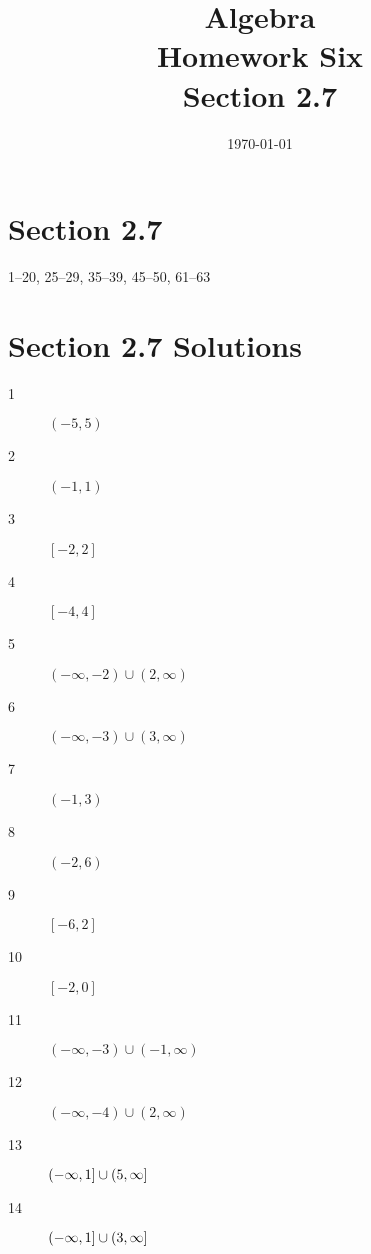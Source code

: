 \documentclass[letterpaper]{exam}
\title{Algebra \\ Homework Six \\ Section 2.7 }
\author{}
\date{\today}
\begin{document}
  \maketitle

  \section{Section 2.7}
  1--20, 25--29, 35--39, 45--50, 61--63

  \ifprintanswers{}

    \section{Section 2.7 Solutions} 

   \begin{description}

      \item[1] $ ( -5, 5 ) $

      \item[2] $ ( -1, 1 ) $

      \item[3] $ [ -2, 2 ] $

      \item[4] $ [ -4, 4 ] $

      \item[5] $ ( -\infty, -2 ) \cup ( 2, \infty ) $

      \item[6] $ ( -\infty, -3 ) \cup ( 3, \infty ) $

      \item[7] $ ( -1, 3 ) $

      \item[8] $ ( -2, 6 ) $

      \item[9] $ [ -6, 2 ] $

      \item[10] $ [ -2, 0 ] $

      \item[11] $ ( -\infty, -3 ) \cup ( -1, \infty ) $

      \item[12] $ ( -\infty, -4 ) \cup ( 2, \infty ) $

      \item[13] $ \intoc{ -\infty, 1 } \cup \intoc{ 5, \infty } $

      \item[14] $ \intoc{ -\infty, 1 } \cup \intoc{ 3, \infty } $


\end{description}
\end{document}
